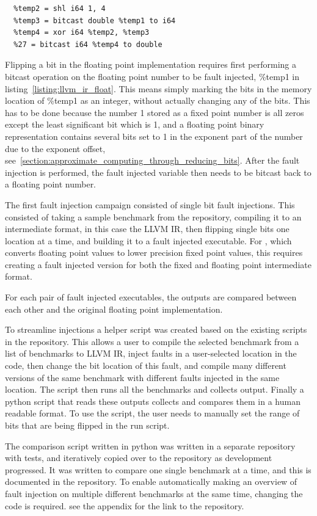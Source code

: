 \begin{lstlisting}[caption=floating point bit flip in llvm-ir, label=listing:llvm_ir_float]
  %temp1 = fdiv double %24, %26
  %temp2 = shl i64 1, 4
  %temp3 = bitcast double %temp1 to i64
  %temp4 = xor i64 %temp2, %temp3
  %27 = bitcast i64 %temp4 to double
\end{lstlisting}

Flipping a bit in the floating point implementation requires first performing a bitcast operation on the floating point number to be fault injected, \%temp1 in listing~\ref{listing:llvm_ir_float}. This means simply marking the bits in the memory location of \%temp1 as an integer, without actually changing any of the bits. This has to be done because the number 1 stored as a fixed point number is all zeros except the least significant bit which is 1, and a floating point binary representation contains several bits set to 1 in the exponent part of the number due to the exponent offset, see~\ref{section:approximate_computing_through_reducing_bits}. After the fault injection is performed, the fault injected variable then needs to be bitcast back to a floating point number.

The first fault injection campaign consisted of single bit fault injections. This consisted of taking a sample benchmark from the \taffo{} repository, compiling it to an intermediate format, in this case the LLVM IR, then flipping single bits one location at a time, and building it to a fault injected executable. For \taffo{}, which converts floating point values to lower precision fixed point values, this requires creating a fault injected version for both the fixed and floating point intermediate format.

For each pair of fault injected executables, the outputs are compared between each other and the original floating point implementation.

To streamline injections a helper script was created based on the existing scripts in the \taffo{} repository. This allows a user to compile the selected benchmark from a list of benchmarks to LLVM IR, inject faults in a user-selected location in the code, then change the bit location of this fault, and compile many different versions of the same benchmark with different faults injected in the same location. The script then runs all the benchmarks and collects output. Finally a python script that reads these outputs collects and compares them in a human readable format. To use the script, the user needs to manually set the range of bits that are being flipped in the run script. 

The comparison script written in python was written in a separate repository with tests, and iteratively copied over to the \taffo{} repository as development progressed. It was written to compare one single benchmark at a time, and this is documented in the repository. To enable automatically making an overview of fault injection on multiple different benchmarks at the same time, changing the code is required. see the appendix for the link to the repository.





